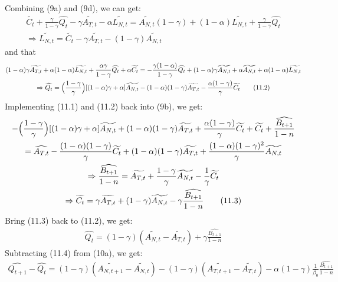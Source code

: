 \documentclass[a4paper,12pt]{article} %
\theoremstyle{nonitalic}
\begin{document}
Combining (9a) and (9d), we can get:
\begin{gather*}
    \widetilde{C_t} + \frac{\gamma}{1-\gamma} \widehat{Q_t} - \gamma \widetilde{A_{T,t}} - \alpha \widetilde{L_{N,t}} = \widetilde{A_{N,t}}(1-\gamma) + (1-\alpha)\widetilde{L_{N,t}} + \frac{\gamma}{1-\gamma}\widehat{Q_t} \\
    \Rightarrow \widetilde{L_{N,t}} = \widetilde{C_t} - \gamma\widetilde{A_{T,t}} - (1-\gamma) \widetilde{A_{N,t}} \tag{11.1}
\end{gather*}
and that
\begin{gather*}
    (1-\alpha) \gamma \widetilde{A_{T,t}} + \alpha (1-\alpha) \widetilde{L_{N,t}} + \frac{\alpha \gamma}{1-\gamma} \widehat{Q_t} + \alpha \widetilde{C_t} = -\frac{\gamma(1-\alpha)}{1-\gamma}\widehat{Q_t} + (1-\alpha) \gamma \widetilde{A_{N,t}} + \alpha \widetilde{A_{N,t}} + \alpha(1-\alpha)\widetilde{L_{N,t}} \\
    \Rightarrow \widehat{Q_t} = \Bigl(\frac{1-\gamma}{\gamma}\Bigr) [(1-\alpha)\gamma + \alpha] \widetilde{A_{N,t}} - (1-\alpha)(1-\gamma)\widetilde{A_{T,t}} - \frac{\alpha(1-\gamma)}{\gamma} \widetilde{C_t} \tag{11.2}
\end{gather*}
Implementing (11.1) and (11.2) back into (9b), we get:
\begin{gather*}
    - \Bigl(\frac{1-\gamma}{\gamma}\Bigr) [(1-\alpha)\gamma + \alpha] \widetilde{A_{N,t}} + (1-\alpha)(1-\gamma)\widetilde{A_{T,t}} + \frac{\alpha(1-\gamma)}{\gamma} \widetilde{C_t} + \widetilde{C_t} + \frac{\widehat{B_{t+1}}}{1-n} \\
        = \widehat{A_{T,t}} - \frac{(1-\alpha)(1-\gamma)}{\gamma} \widetilde{C_t} + (1-\alpha)(1-\gamma)\widetilde{A_{T,t}} + \frac{(1-\alpha)(1-\gamma)^2}{\gamma} \widetilde{ A_{N,t}} \\
        \Rightarrow \frac{\widehat{B_{t+1}}}{1-n} = \widetilde{A_{T,t}} + \frac{1-\gamma}{\gamma} \widetilde{A_{N,t}} - \frac{1}{\gamma} \widetilde{C_t}\\
        \Rightarrow \widetilde{C_t} = \gamma \widetilde{A_{T,t}} + (1-\gamma) \widetilde{A_{N,t}} - \gamma \frac{\widehat{B_{t+1}}}{1-n} \tag{11.3}
\end{gather*}
Bring (11.3) back to (11.2), we get:
\begin{gather*}
    \widehat{Q_t} = (1-\gamma) (\widetilde{A_{N,t}} - \widetilde{A_{T,t}}) + \gamma \frac{\widehat{B_{t+1}}}{1-n} \tag{11.4}
\end{gather*}
Subtracting (11.4) from (10a), we get:
\begin{gather*}
    \widehat{Q_{t+1}} - \widehat{Q_t} = (1-\gamma) (\widetilde{A_{N,t+1}} - \widetilde{A_{N,t}}) - (1-\gamma) (\widetilde{A_{T,t+1}} - \widetilde{A_{T,t}}) - \alpha (1-\gamma) \frac{1}{\beta_0} \frac{\widehat{B_{t+1}}}{1-n} \tag{11.5}
\end{gather*}
\end{document}
